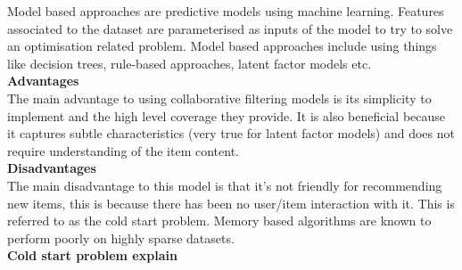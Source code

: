 Model based approaches are predictive models using machine learning. Features associated to the dataset are parameterised as inputs of the model to try to solve an optimisation related problem. Model based approaches include using things like decision trees, rule-based approaches, latent factor models etc.
\\\textbf{Advantages}
\\The main advantage to using collaborative filtering models is its simplicity to implement and the high level coverage they provide. It is also beneficial because it captures subtle characteristics (very true for latent factor models) and does not require understanding of the item content.
\\ \textbf{Disadvantages}
\\The main disadvantage to this model is that it’s not friendly for recommending new items, this is because there has been no user/item interaction with it. This is referred to as the cold start problem. Memory based algorithms are known to perform poorly on highly sparse datasets.
\\ \textbf{Cold start problem explain}


